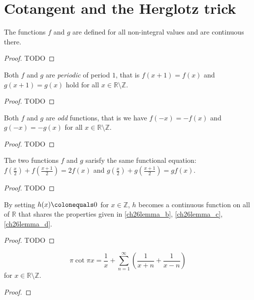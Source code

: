 \chapter{Cotangent and the Herglotz trick}

\begin{lemma}[A]
  \label{ch26lemma_a}
  The functions $f$ and $g$ are defined for all non-integral values and are continuous there.
\end{lemma}
\begin{proof}
  TODO
\end{proof}

\begin{lemma}[B]
  \label{ch26lemma_b}
  Both $f$ and $g$ are \emph{periodic} of period $1$, that is $f(x + 1) = f(x)$ and
  $g(x + 1) = g(x)$ hold for all $x\in \mathbb{R}\setminus\mathbb{Z}$.
\end{lemma}
\begin{proof}
  TODO
\end{proof}

\begin{lemma}[C]
  \label{ch26lemma_c}
  Both $f$ and $g$ are \emph{odd} functions, that is we have $f(-x) = -f(x)$ and
  $g(-x) = -g(x)$ for all $x\in \mathbb{R}\setminus\mathbb{Z}$.
\end{lemma}
\begin{proof}
  TODO
\end{proof}


\begin{lemma}[D]
  \label{ch26lemma_d}
  The two functions $f$ and $g$ sarisfy the same functional equation:
  $f(\frac{x}{2}) + f(\frac{x + 1}{2}) = 2f(x)$ and
  $g(\frac{x}{2}) + g(\frac{x + 1}{2}) = gf(x)$.
\end{lemma}
\begin{proof}
  TODO
\end{proof}

\begin{lemma}[E]
  \label{ch26lemma_e}
  By setting $h(x) \colonequals 0$ for $x \in \mathbb{Z}$, $h$ becomes a continuous function
  on all of $\mathbb{R}$ that shares the properties given in
  \ref{ch26lemma_b}, \ref{ch26lemma_c}, \ref{ch26lemma_d}.
\end{lemma}
\begin{proof}
  TODO
\end{proof}

\begin{theorem}
  \label{ch26}
  \[
  \pi\cot{\pi x} = \frac{1}{x} + \sum_{n = 1}^\infty \left(\frac{1}{x + n} + \frac{1}{x - n}\right)
  \]
  for $x\in \mathbb{R}\setminus\mathbb{Z}$.
\end{theorem}
\begin{proof}
\end{proof}
